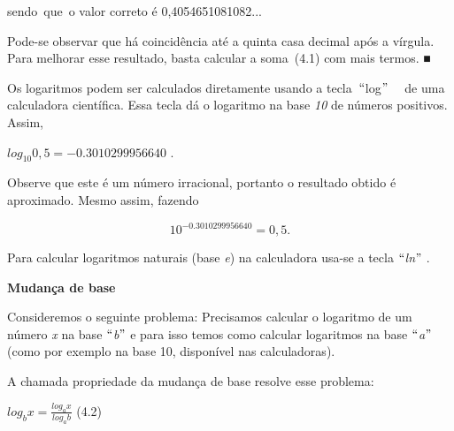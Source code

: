 \documentclass[12pt]{article}
\begin{document}
\begin{enumerate}[label*={\fontsize{14pt}{14pt}\selectfont \textbf{\arabic*.}}]
\begin{enumerate}
sendo\ que\ o valor correto é   0,4054651081082...\par

Pode-se observar que há coincidência até a quinta casa decimal após a vírgula. Para melhorar esse resultado, basta calcular a soma\  (4.1) com mais termos. ■\par


\vspace{\baselineskip}

\vspace{\baselineskip}
\begin{justify}
Os logaritmos podem ser calculados diretamente usando a tecla\  $``$log$"$ \ \  de uma calculadora científica. Essa tecla dá o logaritmo na base \textit{10} de números positivos. Assim, 
\end{justify}\par

\begin{justify}
\tab  \( log_{10}0,5=- 0.3010299956640 \) .
\end{justify}\par

Observe que este é um número irracional, portanto o resultado obtido é aproximado. Mesmo assim, fazendo \par

 \[ 10^{- 0.3010299956640}=0,5.  \] \par

Para calcular logaritmos naturais (base \textit{e}) na calculadora usa-se a tecla $``$\textit{ln}$"$ .\par


\vspace{\baselineskip}
\textbf{Mudança de base}\par

Consideremos o seguinte problema: Precisamos calcular o logaritmo de um número \textit{x} na base $``$\textit{b}$"$  e para isso temos como calcular logaritmos na base $``$\textit{a}$"$  (como por exemplo na base 10, disponível nas calculadoras).\par

A chamada propriedade da mudança de base resolve esse problema:\par

\begin{FlushRight}
 \( log_{b}x=\frac{log_{a}x}{log_{a}b} \) \tab \tab \tab \tab \tab \tab \tab (4.2)
\end{FlushRight}\par


\end{enumerate}
\end{enumerate}
\end{document}
